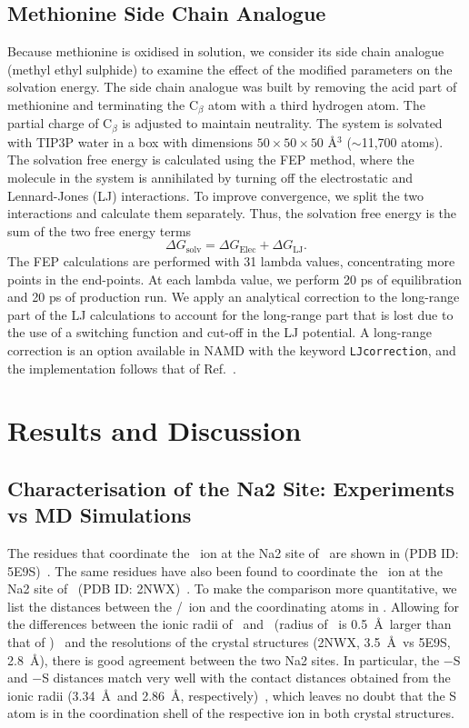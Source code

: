 \subsection{Methionine Side Chain Analogue}
Because methionine is oxidised in solution, we consider its side chain analogue (methyl ethyl sulphide) 
to examine the effect of the modified parameters on the solvation energy. The side chain analogue was 
built by removing the acid part of methionine and terminating the C$_{\beta}$ atom with a third 
hydrogen atom. The partial charge of C$_{\beta}$ is adjusted to maintain neutrality. The system is 
solvated with TIP3P water in a box with dimensions $50\times 50\times 50$ \AA$^3$ ($\sim$11,700 
atoms). The solvation free energy is calculated using the FEP method, where the molecule in the 
system is annihilated by turning off the electrostatic and Lennard-Jones (LJ) interactions. To 
improve convergence, we split the two interactions and calculate them separately. Thus, the 
solvation free energy is the sum of the two free energy terms 
\begin{equation}
\Delta G_{\text{solv}} = \Delta G_{\text{Elec}} + \Delta G_{\text{LJ}}.
\end{equation}
The FEP calculations are performed with 31 lambda values, concentrating more points in the end-points. 
At each lambda value, we perform 20 ps of equilibration and 20 ps of production run. We apply an 
analytical correction to the long-range part of the LJ calculations to account for the long-range 
part that is lost due to the use of a switching function and cut-off in the LJ potential. A 
long-range correction is an option available in NAMD with the keyword \verb+LJcorrection+, and 
the implementation follows that of Ref.~\cite{Shirts2007}.

\section{Results and Discussion}
\subsection{Characterisation of the Na2 Site: Experiments vs MD Simulations}
The residues that coordinate the \Na\ ion at the Na2 site of \GltTk\ are shown in  
(PDB ID: 5E9S)~\cite{Guskov2016}. The same residues have also been found to coordinate the \Tl\ ion 
at the Na2 site of \GltPh\ (PDB ID: 2NWX)~\cite{Boudker2007}. To make the comparison more quantitative, 
we list the distances between the \Tl/\Na\ ion and the coordinating atoms in . 
Allowing for the differences between the ionic radii of \Tl\ and \Na\ (radius of \Tl\ is 0.5~\AA\ 
larger than that of \Na)~\cite{Shannon1976} and the resolutions of the crystal structures (2NWX, 
3.5~\AA\ vs 5E9S, 2.8~\AA), there is good agreement between the two Na2 sites. In particular, 
the \Tl$-$S and \Na$-$S distances match very well with the contact distances obtained from the ionic 
radii (3.34~\AA\ and 2.86~\AA, respectively)~\cite{Shannon1976}, which leaves no doubt that the S 
atom is in the coordination shell of the respective ion in both crystal structures.

